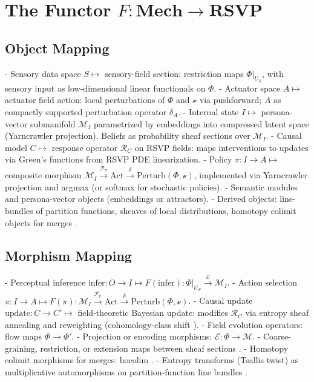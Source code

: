 \documentclass{article}
\theoremstyle{plain}
\theoremstyle{definition}
\begin{document}
\section{The Functor $F: \mathbf{Mech} \to \mathbf{RSVP}$}

\subsection{Object Mapping}
- Sensory data space $S \mapsto$ sensory-field section: restriction maps $\Phi|_{U_S}$, with sensory input as low-dimensional linear functionals on $\Phi$.
- Actuator space $A \mapsto$ actuator field action: local perturbations of $\Phi$ and $\mathcal{v}$ via pushforward; $A$ as compactly supported perturbation operator $\delta_A$.
- Internal state $I \mapsto$ persona-vector submanifold $\mathcal{M}_I$ parametrized by embeddings into compressed latent space (Yarncrawler projection). Beliefs as probability sheaf sections over $\mathcal{M}_I$.
- Causal model $C \mapsto$ response operator $\mathcal{R}_C$ on RSVP fields: maps interventions to updates via Green’s functions from RSVP PDE linearization.
- Policy $\pi: I \to A \mapsto$ composite morphism $\mathcal{M}_I \xrightarrow{\mathcal{P}_\pi} \text{Act} \xrightarrow{\delta} \text{Perturb}(\Phi, \mathcal{v})$, implemented via Yarncrawler projection and argmax (or softmax for stochastic policies).
- Semantic modules and persona-vector objects (embeddings or attractors).
- Derived objects: line-bundles of partition functions, sheaves of local distributions, homotopy colimit objects for merges \cite{MacLane1992,Awodey2010}.

\subsection{Morphism Mapping}
- Perceptual inference $\text{infer}: O \to I \mapsto F(\text{infer}): \Phi|_{U_S} \xrightarrow{\mathcal{E}} \mathcal{M}_I$.
- Action selection $\pi: I \to A \mapsto F(\pi): \mathcal{M}_I \xrightarrow{\mathcal{P}_\pi} \text{Act} \xrightarrow{\delta} \text{Perturb}(\Phi, \mathcal{v})$.
- Causal update $\text{update}: C \to C' \mapsto$ field-theoretic Bayesian update: modifies $\mathcal{R}_C$ via entropy sheaf annealing and reweighting (cohomology-class shift \cite{MacLane1992}).
- Field evolution operators: flow maps $\Phi \to \Phi'$.
- Projection or encoding morphisms: $\mathcal{E}: \Phi \to \mathcal{M}$.
- Coarse-graining, restriction, or extension maps between sheaf sections \cite{MacLane1992}.
- Homotopy colimit morphisms for merges: $\text{hocolim}$ \cite{Awodey2010}.
- Entropy transforms (Tsallis twist) as multiplicative automorphisms on partition-function line bundles \cite{Tsallis1988}.
\end{document}
